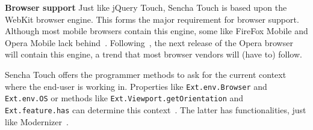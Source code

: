 \documentclass[a4paper]{artikel3}
\newcommand{\term}[1]{\emph{#1}}
\newcommand{\code}[1]{\texttt{#1}}
\renewcommand{\paragraph}[1]{{\bf #1} }
\begin{document}
% 
% 

\paragraph{Browser support}
Just like jQuery Touch,  Sencha Touch is based upon the WebKit browser engine.  This forms the major requirement for browser support.  Although most mobile browsers contain this engine,  some like FireFox Mobile and Opera Mobile lack behind~\cite{JohnEClark2012}.  Following~\cite{Wokke2013}, the next release of the Opera browser will contain this engine,  a trend that most browser vendors will (have to) follow.

Sencha Touch offers the programmer methods to ask for the current context where the end-user is working in.  Properties like \code{Ext.env.Browser} and \code{Ext.env.OS} or methods like \code{Ext.Viewport.getOrientation} and \code{Ext.feature.has} can determine this context~\cite{JohnEClark2012}.  The latter has functionalities,  just like Modernizer~\cite{Modernizr2012}.  

\end{document}
